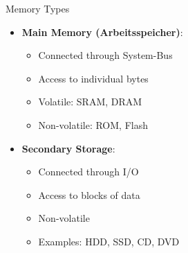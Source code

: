 \begin{concept}{Memory Types}
\begin{itemize}
  \item \textbf{Main Memory (Arbeitsspeicher)}:
    \begin{itemize}
      \item Connected through System-Bus
      \item Access to individual bytes
      \item Volatile: SRAM, DRAM
      \item Non-volatile: ROM, Flash
    \end{itemize}
  \item \textbf{Secondary Storage}:
    \begin{itemize}
      \item Connected through I/O
      \item Access to blocks of data
      \item Non-volatile
      \item Examples: HDD, SSD, CD, DVD
    \end{itemize}
\end{itemize}
\end{concept}

